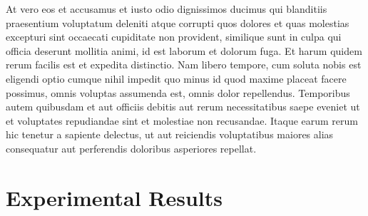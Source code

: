 \documentclass[ijoc,nonblindrev]{informs3} %
\begin{document}
At vero eos et accusamus et iusto odio dignissimos ducimus qui
blanditiis praesentium voluptatum deleniti atque corrupti quos dolores
et quas molestias excepturi sint occaecati cupiditate non provident,
similique sunt in culpa qui officia deserunt mollitia animi, id est
laborum et dolorum fuga. Et harum quidem rerum facilis est et expedita
distinctio. Nam libero tempore, cum soluta nobis est eligendi optio
cumque nihil impedit quo minus id quod maxime placeat facere possimus,
omnis voluptas assumenda est, omnis dolor repellendus. Temporibus autem
quibusdam et aut officiis debitis aut rerum necessitatibus saepe eveniet
ut et voluptates repudiandae sint et molestiae non recusandae. Itaque
earum rerum hic tenetur a sapiente delectus, ut aut reiciendis
voluptatibus maiores alias consequatur aut perferendis doloribus
asperiores repellat.

\section{Experimental Results}



%
%
%




\end{document}
